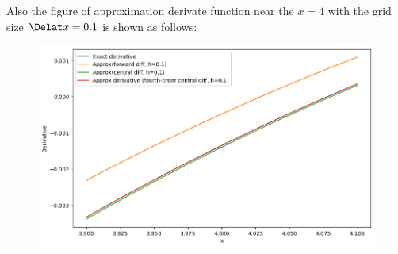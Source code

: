 \documentclass{article}
\begin{document}
\newpage
Also the figure of approximation derivate function near the $x=4$ with the grid size $\Delat x = 0.1$ is shown as follows:
\begin{figure}[htpb]
    \centering
    \includegraphics[scale=0.4]{derivate function.png}
    \label{fig:enter-label}
\end{figure}
\end{document}
